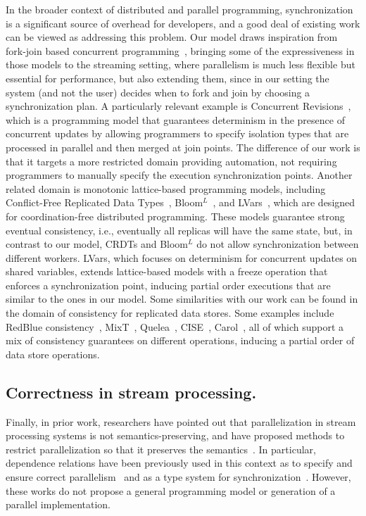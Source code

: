In the broader context of distributed and parallel programming,
synchronization is a significant source of overhead for developers,
and a good deal of existing work can be viewed as addressing this problem.
Our model draws inspiration from fork-join based
concurrent programming~\cite{frigo1998implementation,lea2000java},
  bringing some of the expressiveness in those models to the streaming setting,
  where parallelism is much less flexible but essential for performance,
  but also extending them, since in our setting the system (and not the user) decides when to fork and join by choosing a synchronization plan.
%
A particularly relevant example is
Concurrent Revisions~\cite{burckhardt2010concurrent},
which is a programming model that guarantees determinism in the presence of concurrent updates by allowing programmers to specify isolation types that are processed in parallel and then merged at join points.
The difference of our work is that it targets a more restricted domain providing automation,
not requiring programmers to manually specify the execution synchronization points.
Another related domain is monotonic lattice-based programming models,
including
Conflict-Free Replicated Data Types~\cite{shapiro2011conflict},
Bloom$^L$~\cite{conway12},
and LVars~\cite{lvars13,lvars14},
which are designed for coordination-free distributed programming.
These models guarantee strong eventual consistency,
i.e., eventually all replicas will have the same state,
but, in contrast to our model, CRDTs and Bloom$^L$
do not allow synchronization between different workers.
LVars, which focuses on determinism for concurrent updates on shared variables,
extends lattice-based models with a freeze operation that enforces a synchronization point,
inducing partial order executions that are similar to the ones in our model.
Some similarities with our work can be found in the domain of consistency for replicated data stores.
Some examples include RedBlue consistency~\cite{li2012making},
MixT~\cite{milano2018mixt},
Quelea~\cite{sivaramakrishnan2015declarative},
CISE~\cite{gotsman16},
Carol~\cite{lewchenko2019sequential},
all of which support a mix of consistency guarantees on different operations,
inducing a partial order of data store operations.

\subsection{Correctness in stream processing.}

Finally, in prior work,
researchers have pointed out that
parallelization in stream processing systems is not
semantics-preserving, and have proposed methods to restrict
parallelization so that it preserves the
semantics~\cite{schneider2015safeparallelism, mamouras2019data}.
In particular, dependence relations have been previously used in this context
as to specify and ensure correct parallelism~\cite{mamouras2019data,2020:DifferentialTesting:OOPSLA}
and as a type system for synchronization~\cite{alur2021synchronization}.
However, these works do not propose a general programming model
or generation of a parallel implementation.
